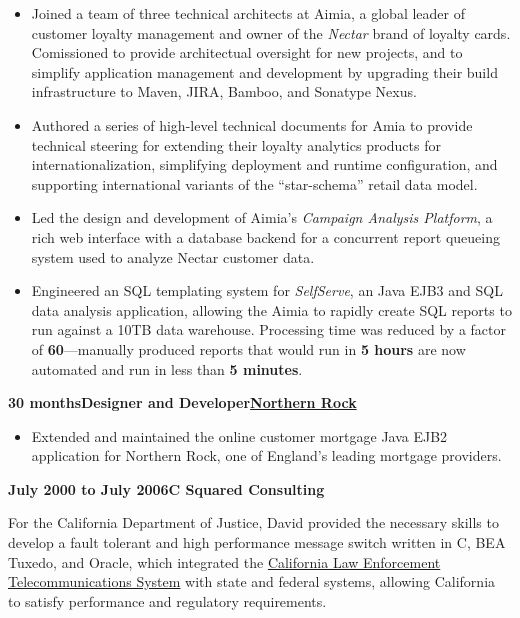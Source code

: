 \documentclass[a4paper,12pt]{article}
\newcommand{\jobheld}[2]{\textbf{#1\hfill #2}\nopagebreak}
\newcommand{\clientwork}[3]{\textbf{#1\hfill#3\hfill#2}\nopagebreak}
\begin{document}
\begin{itemize}

\item Joined a team of three technical architects at Aimia, a global leader of customer loyalty management and owner of the \emph{Nectar} brand of loyalty cards.  Comissioned to provide architectual oversight for new projects, and to simplify application management and development by upgrading their build infrastructure to Maven, JIRA, Bamboo, and Sonatype Nexus.

\item Authored a series of high-level technical documents for Amia to provide technical steering for extending their loyalty analytics products for internationalization, simplifying deployment and runtime configuration, and supporting international variants of the ``star-schema'' retail data model.  

\item Led the design and development of Aimia's \emph{Campaign Analysis Platform}, a rich web interface with a database backend for a concurrent report queueing system used to analyze Nectar customer data.

\item Engineered an SQL templating system for \emph{SelfServe}, an Java EJB3 and SQL data analysis application, allowing the Aimia to rapidly create SQL reports to run against a 10TB data warehouse.  Processing time was reduced by a factor of \textbf{60}---manually produced reports that would run in \textbf{5 hours} are now automated and run in less than \textbf{5 minutes}.

\end{itemize}

\clientwork{30 months}{\href{http://www.northernrock.co.uk}{Northern Rock}}{Designer and Developer}

\begin{itemize}

\item Extended and maintained the online customer mortgage Java EJB2 application for Northern Rock, one of England's leading mortgage providers.

\end{itemize}

\jobheld{July 2000 to July 2006}{C Squared Consulting}

For the California Department of Justice, David provided the necessary skills to develop a fault tolerant and high performance message switch written in C, BEA Tuxedo, and Oracle, which integrated the \href{http://definitions.uslegal.com/c/clets/}{California Law Enforcement Telecommunications System} with state and federal systems, allowing California to satisfy performance and regulatory requirements. \\
\end{document}
